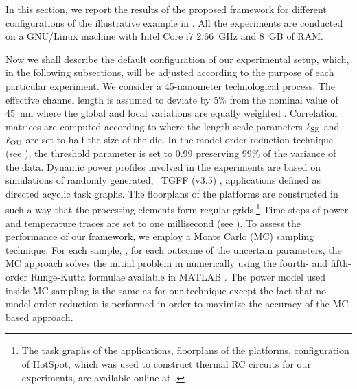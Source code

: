 
In this section, we report the results of the proposed framework for different configurations of the illustrative example in .
All the experiments are conducted on a GNU/Linux machine with Intel Core i7 2.66~GHz and 8~GB of RAM.

Now we shall describe the default configuration of our experimental setup, which, in the following subsections, will be adjusted according to the purpose of each particular experiment.
We consider a 45-nanometer technological process.
The effective channel length is assumed to deviate by 5\% from the nominal value of 45~nm where the global and local variations are equally weighted \cite{juan2011, juan2012}.
Correlation matrices are computed according to  where the length-scale parameters $\ell_{\text{SE}}$ and $\ell_{\text{OU}}$ are set to half the size of the die.
In the model order reduction technique (see ), the threshold parameter is set to 0.99 preserving 99\% of the variance of the data.
Dynamic power profiles involved in the experiments are based on simulations of randomly generated, \via\ TGFF (v3.5) \cite{dick1998}, applications defined as directed acyclic task graphs.
The floorplans of the platforms are constructed in such a way that the processing elements form regular grids.\footnote{The task graphs of the applications, floorplans of the platforms, configuration of HotSpot, which was used to construct thermal RC circuits for our experiments, are available online at \cite{sources}.}
Time steps of power and temperature traces are set to one millisecond (see ).
To assess the performance of our framework, we employ a Monte Carlo (MC) sampling technique.
For each sample, \ie, for each outcome of the uncertain parameters, the MC approach solves the initial problem in  numerically using the fourth- and fifth-order Runge-Kutta formulae \cite{press2007} available in MATLAB \cite{matlab}.
The power model used inside MC sampling is the same as for our technique except the fact that no model order reduction is performed in order to maximize the accuracy of the MC-based approach.

